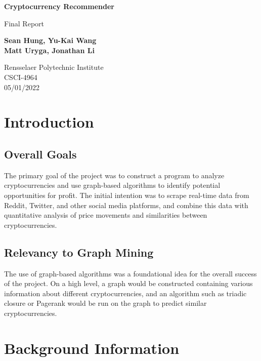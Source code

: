 \documentclass[11pt]{article}
\begin{document}
\begin{titlepage}
\begin{center}
	\vspace*{1cm}

	\textbf{\Huge Cryptocurrency Recommender}

	\vspace{0.5cm}
	{\large Final Report}

	\vspace{1.5cm}

	\textbf{Sean Hung, Yu-Kai Wang\\Matt Uryga, Jonathan Li}

	\vfill

	Rensselaer Polytechnic Institute\\
	CSCI-4964\\
	05/01/2022
\end{center}
\end{titlepage}

\section{Introduction}
\subsection{Overall Goals}
The primary goal of the project was to construct a program to analyze cryptocurrencies and use graph-based algorithms to identify potential opportunities for profit.  The initial intention was to scrape real-time data from Reddit, Twitter, and other social media platforms, and combine this data with quantitative analysis of price movements and similarities between cryptocurrencies.

\subsection{Relevancy to Graph Mining}
The use of graph-based algorithms was a foundational idea for the overall success of the project.  On a high level, a graph would be constructed containing various information about different cryptocurrencies, and an algorithm such as triadic closure or Pagerank would be run on the graph to predict similar cryptocurrencies.\\[2mm]


\section{Background Information}
\end{document}
